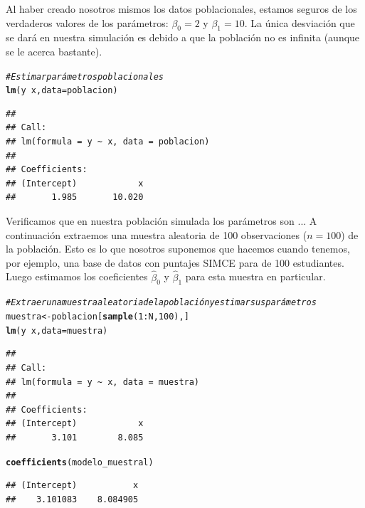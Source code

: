 \documentclass{report}\usepackage[]{graphicx}\usepackage[]{color}
\makeatletter
\newcommand{\hlnum}[1]{\textcolor[rgb]{0.686,0.059,0.569}{#1}}%
\newcommand{\hlcom}[1]{\textcolor[rgb]{0.678,0.584,0.686}{\textit{#1}}}%
\newcommand{\hlopt}[1]{\textcolor[rgb]{0,0,0}{#1}}%
\newcommand{\hlstd}[1]{\textcolor[rgb]{0.345,0.345,0.345}{#1}}%
\newcommand{\hlkwb}[1]{\textcolor[rgb]{0.69,0.353,0.396}{#1}}%
\newcommand{\hlkwc}[1]{\textcolor[rgb]{0.333,0.667,0.333}{#1}}%
\newcommand{\hlkwd}[1]{\textcolor[rgb]{0.737,0.353,0.396}{\textbf{#1}}}%
\newenvironment{kframe}{%
 \def\at@end@of@kframe{}%
 \ifinner\ifhmode%
  \def\at@end@of@kframe{\end{minipage}}%
  \begin{minipage}{\columnwidth}%
 \fi\fi%
 \def\FrameCommand##1{\hskip\@totalleftmargin \hskip-\fboxsep
 \colorbox{shadecolor}{##1}\hskip-\fboxsep
     \hskip-\linewidth \hskip-\@totalleftmargin \hskip\columnwidth}%
 \MakeFramed {\advance\hsize-\width
   \@totalleftmargin\z@ \linewidth\hsize
   \@setminipage}}%
 {\par\unskip\endMakeFramed%
 \at@end@of@kframe}
\newenvironment{knitrout}{}{} %
\makeatother
\begin{document}
Al haber creado nosotros mismos los datos poblacionales, estamos seguros de los verdaderos valores de los parámetros: $\beta_0=2$ y $\beta_1=10$. La única desviación que se dará en nuestra simulación es debido a que la población no es infinita (aunque se le acerca bastante).

\begin{knitrout}
\color{fgcolor}\begin{kframe}
\begin{alltt}
\hlcom{# Estimar parámetros poblacionales}
\hlkwd{lm}\hlstd{(y}\hlopt{~}\hlstd{x,} \hlkwc{data} \hlstd{= poblacion)}
\end{alltt}
\begin{verbatim}
## 
## Call:
## lm(formula = y ~ x, data = poblacion)
## 
## Coefficients:
## (Intercept)            x  
##       1.985       10.020
\end{verbatim}
\end{kframe}
\end{knitrout}

Verificamos que en nuestra población simulada los parámetros son ...
A continuación extraemos una muestra aleatoria de 100 observaciones ($n=100$) de la población. Esto es lo que nosotros suponemos que hacemos cuando tenemos, por ejemplo, una base de datos con puntajes SIMCE para de 100 estudiantes.
Luego estimamos los coeficientes $\hat\beta_0$ y $\hat\beta_1$ para esta muestra en particular.

\begin{knitrout}
\color{fgcolor}\begin{kframe}
\begin{alltt}
\hlcom{# Extraer una muestra aleatoria de la población y estimar sus parámetros}
\hlstd{muestra} \hlkwb{<-} \hlstd{poblacion[}\hlkwd{sample}\hlstd{(}\hlnum{1}\hlopt{:}\hlstd{N,} \hlnum{100}\hlstd{),]}
\hlkwd{lm}\hlstd{(y}\hlopt{~}\hlstd{x,} \hlkwc{data} \hlstd{= muestra)}
\end{alltt}
\begin{verbatim}
## 
## Call:
## lm(formula = y ~ x, data = muestra)
## 
## Coefficients:
## (Intercept)            x  
##       3.101        8.085
\end{verbatim}
\begin{alltt}
\hlkwd{coefficients}\hlstd{(modelo_muestral)}
\end{alltt}
\begin{verbatim}
## (Intercept)           x 
##    3.101083    8.084905
\end{verbatim}
\end{kframe}
\end{knitrout}
\end{document}
